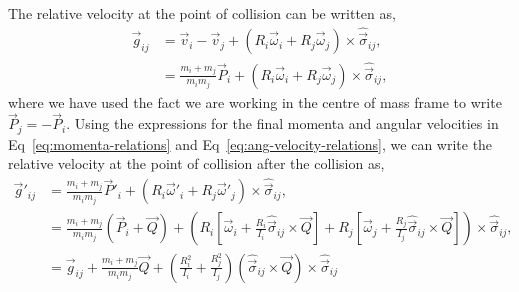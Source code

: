 \documentclass{article}
\begin{document}
The relative velocity at the point of collision can be written as,
\begin{align}
    \vec{g}_{ij}
    &=
    \vec{v}_i - \vec{v}_j + 
    \left(
        R_i \vec{\omega}_i + R_j \vec{\omega}_j
    \right) \times \hat{\vec{\sigma}}_{ij}, \\
    &=
    \frac{m_i + m_j}{m_i m_j}
    \vec{P}_i
    + 
    \left(
        R_i \vec{\omega}_i + R_j \vec{\omega}_j
    \right) \times \hat{\vec{\sigma}}_{ij},
\end{align}
where we have used the fact we are working in the centre of mass frame to write $\vec{P}_j = - \vec{P}_i$. Using the expressions for the final momenta and angular velocities in Eq~\ref{eq:momenta-relations} and Eq~\ref{eq:ang-velocity-relations}, we can write the relative velocity at the point of collision after the collision as,
\begin{align}
    \vec{g}'_{ij}
    &=
    \frac{m_i + m_j}{m_i m_j}
    \vec{P}'_i
    + 
    \left(
        R_i \vec{\omega}'_i + R_j \vec{\omega}'_j
    \right) \times \hat{\vec{\sigma}}_{ij}, \\
    &=
    \frac{m_i + m_j}{m_i m_j}
    \left(
        \vec{P}_i + \vec{Q}
    \right)
    + 
    \left(
        R_i 
        \left[
            \vec{\omega}_i + \frac{R_i}{I_i} \hat{\vec{\sigma}}_{ij} \times \vec{Q}
        \right]
        +
        R_j
        \left[
            \vec{\omega}_j + \frac{R_j}{I_j} \hat{\vec{\sigma}}_{ij} \times \vec{Q}
        \right]
    \right) \times \hat{\vec{\sigma}}_{ij}, \\
    &=
    \vec{g}_{ij}
    +
    \frac{m_i + m_j}{m_i m_j} \vec{Q}
    +
    \left(
        \frac{R_i^2}{I_i} + \frac{R_j^2}{I_j}
    \right)
    \left(
        \hat{\vec{\sigma}}_{ij} \times \vec{Q}
    \right)
    \times \hat{\vec{\sigma}}_{ij}
\end{align}
\end{document}
